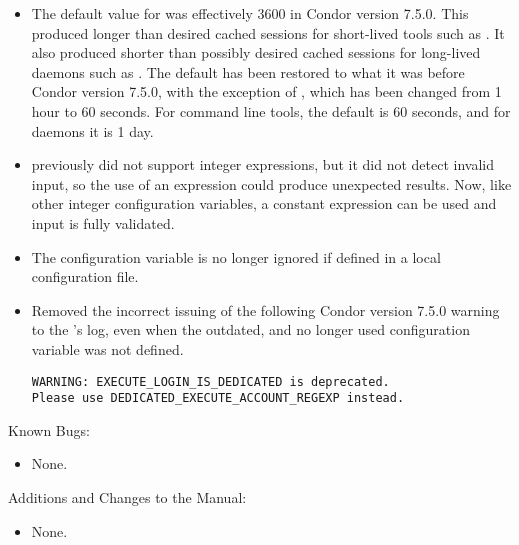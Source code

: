 \begin{itemize}

\item The default value for 
  was effectively 3600 in Condor version 7.5.0.
  This produced longer than desired
  cached sessions for short-lived tools such as .
  It also produced shorter than possibly desired cached sessions for
  long-lived daemons such as .  
  The default has been restored to what it was before Condor version 7.5.0,
  with the exception of ,
  which has been changed from 1 hour to 60 seconds.
  For command line tools, the default is 60 seconds,
  and for daemons it is 1 day.

\item {} previously did
  not support integer expressions, but it did not detect invalid
  input, so the use of an expression could produce unexpected results.
  Now, like other integer configuration variables,
  a constant expression can be used and input is fully validated.

\item The configuration variable  is no longer
ignored if defined in a local configuration file.

\item Removed the incorrect issuing of the following Condor version 7.5.0 
  warning to the
  's log, even when the outdated, and no longer used
  configuration
  variable  was not defined.

\begin{verbatim}
WARNING: EXECUTE_LOGIN_IS_DEDICATED is deprecated.
Please use DEDICATED_EXECUTE_ACCOUNT_REGEXP instead.
\end{verbatim}


\end{itemize}

\noindent Known Bugs:

\begin{itemize}

\item None.

\end{itemize}

\noindent Additions and Changes to the Manual:

\begin{itemize}

\item None.

\end{itemize}


